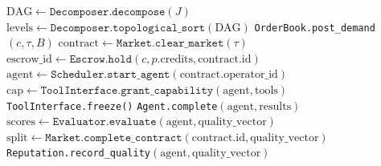 \documentclass[12pt,a4paper]{article}
\theoremstyle{definition}
\begin{document}
\begin{algorithm}[H]
\DontPrintSemicolon
\SetAlgoLined
{}
\BlankLine
{}
$\text{DAG} \gets \texttt{Decomposer.decompose}(J)$\;
$\text{levels} \gets \texttt{Decomposer.topological\_sort}(\text{DAG})$\;
\BlankLine
{}
\texttt{OrderBook.post\_demand}$(c, \tau, B)$\;
$\text{contract} \gets \texttt{Market.clear\_market}(\tau)$\;
$\text{escrow\_id} \gets \texttt{Escrow.hold}(c, p.\text{credits}, \text{contract.id})$\;
\BlankLine
{}
$\text{agent} \gets \texttt{Scheduler.start\_agent}(\text{contract.operator\_id})$\;
$\text{cap} \gets \texttt{ToolInterface.grant\_capability}(\text{agent}, \text{tools})$\;
\texttt{ToolInterface.freeze()}\;
\texttt{Agent.complete}$(\text{agent}, \text{results})$\;
\BlankLine
{}
$\text{scores} \gets \texttt{Evaluator.evaluate}(\text{agent}, \text{quality\_vector})$\;
$\text{split} \gets \texttt{Market.complete\_contract}(\text{contract.id}, \text{quality\_vector})$\;
\texttt{Reputation.record\_quality}$(\text{agent}, \text{quality\_vector})$\;
\caption{Complete job execution through all four AgentOS subsystems}
\label{alg:full-job}
\end{algorithm}
\end{document}
